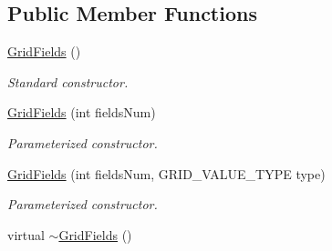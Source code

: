 \subsection*{Public Member Functions}
\begin{DoxyCompactItemize}
\item 
\hypertarget{classfwi_1_1grid_1_1GridFields_a36f0b0b219a047ef181ed18cff94c27e}{\hyperlink{classfwi_1_1grid_1_1GridFields_a36f0b0b219a047ef181ed18cff94c27e}{Grid\-Fields} ()}\label{classfwi_1_1grid_1_1GridFields_a36f0b0b219a047ef181ed18cff94c27e}

\begin{DoxyCompactList}\small\item\em Standard constructor. \end{DoxyCompactList}\item 
\hyperlink{classfwi_1_1grid_1_1GridFields_a103dfb1ef4110ad60cd81855bc3a142e}{Grid\-Fields} (int fields\-Num)
\begin{DoxyCompactList}\small\item\em Parameterized constructor. \end{DoxyCompactList}\item 
\hyperlink{classfwi_1_1grid_1_1GridFields_abea8f442d5246e1a76c7915e877f708d}{Grid\-Fields} (int fields\-Num, G\-R\-I\-D\-\_\-\-V\-A\-L\-U\-E\-\_\-\-T\-Y\-P\-E type)
\begin{DoxyCompactList}\small\item\em Parameterized constructor. \end{DoxyCompactList}\item 
\hypertarget{classfwi_1_1grid_1_1GridFields_a23e7326e33dfd20a305edea9510c10d8}{virtual \hyperlink{classfwi_1_1grid_1_1GridFields_a23e7326e33dfd20a305edea9510c10d8}{$\sim$\-Grid\-Fields} ()}\label{classfwi_1_1grid_1_1GridFields_a23e7326e33dfd20a305edea9510c10d8}


\end{DoxyCompactItemize}
